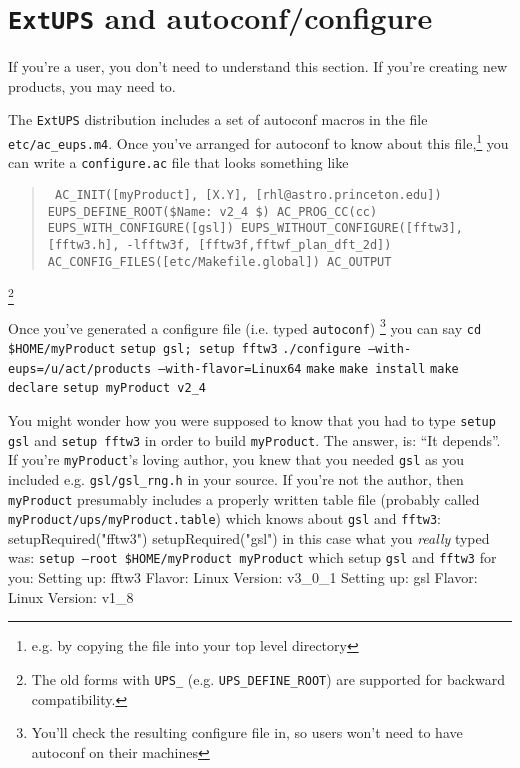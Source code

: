 \documentclass{article}
\newcommand{\code}[1]{\texttt{#1}}
\newcommand{\file}[1]{\texttt{#1}}
\newcommand{\eups}{\code{ExtUPS}}
\let\overbatim=\verbatim
\let\oendverbatim=\endverbatim
\renewenvironment{verbatim}
{\center\minipage{16cm}\overbatim}
{\oendverbatim\endminipage\endcenter}
\begin{document}
\section{\eups{} and autoconf/configure}
\label{autoconf}

If you're a user, you don't need to understand this section. If
you're creating new products, you may need to.

The \eups{} distribution includes a set of autoconf macros
in the file \file{etc/ac\_eups.m4}. Once you've arranged for
autoconf to know about this file,\footnote{e.g. by copying the
  file into your top level directory} you can write a
\file{configure.ac} file that looks something like
\begin{quote}
\obeylines\tt\small\parskip=0pt
AC\_INIT([myProduct], [X.Y], [rhl@astro.princeton.edu])
EUPS\_DEFINE\_ROOT(\${Name}: v2\_4 \$)
AC\_PROG\_CC(cc)
EUPS\_WITH\_CONFIGURE([gsl])
EUPS\_WITHOUT\_CONFIGURE([fftw3], [fftw3.h], -lfftw3f, [fftw3f,fftwf\_plan\_dft\_2d])
AC\_CONFIG\_FILES([etc/Makefile.global])
AC\_OUTPUT
\end{quote}
\footnote{The old forms with \code{UPS\_} (e.g. \code{UPS\_DEFINE\_ROOT})
  are supported for backward compatibility.}

Once you've generated a configure file (i.e. typed \code{autoconf})%
\footnote{You'll check the resulting configure file in, so users won't
  need to have autoconf on their machines}
you can say\hfil\break
\code{cd \$HOME/myProduct}\hfil\break
\code{setup gsl; setup fftw3}\hfil\break
\code{./configure --with-eups=/u/act/products --with-flavor=Linux64}\hfil\break
\code{make}\hfil\break
\code{make install}\hfil\break
\code{make declare}\hfil\break
\code{setup myProduct v2\_4}\hfil\break

You might wonder how you were supposed to know that you had to type
\code{setup gsl} and \code{setup fftw3} in order to build
\code{myProduct}. The answer, is: ``It depends''.  If you're
\code{myProduct}'s loving author, you knew that you needed
\code{gsl} as you included e.g. \code{gsl/gsl\_rng.h} in your
source. If you're not the author, then \code{myProduct} presumably
includes a properly written table file (probably called
\code{myProduct/ups/myProduct.table}) which knows about
\code{gsl} and \code{fftw3}:
\begin{verbatim}
setupRequired("fftw3")
setupRequired("gsl")
\end{verbatim}
in this case what you \textit{really} typed was:\hfil\break
\code{setup --root \$HOME/myProduct myProduct}\hfil\break
which setup \code{gsl} and \code{fftw3} for you:
\begin{verbatim}
Setting up:      fftw3               Flavor: Linux      Version: v3_0_1
Setting up:      gsl                 Flavor: Linux      Version: v1_8
\end{verbatim}
\end{document}
